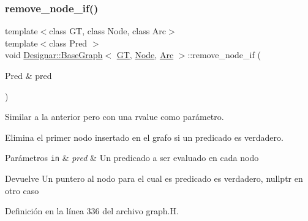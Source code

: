 \subsubsection{\texorpdfstring{remove\+\_\+node\+\_\+if()}{remove\_node\_if()}\hspace{0.1cm}{\footnotesize\ttfamily [1/2]}}
{\footnotesize\ttfamily template$<$class GT, class Node, class Arc$>$ \\
template$<$class Pred $>$ \\
void \hyperlink{class_designar_1_1_base_graph}{Designar\+::\+Base\+Graph}$<$ \hyperlink{demo-buildgraph_8_c_a3001c40d2c31ca87ed96cd7d1334a55e}{GT}, \hyperlink{namespace_designar_a5af326c65aa2bd26b26c410f2030d09e}{Node}, \hyperlink{namespace_designar_a3f55fb5513d62ff47cbc8f72b8e95d6f}{Arc} $>$\+::remove\+\_\+node\+\_\+if (\begin{DoxyParamCaption}\item[{Pred \&}]{pred }\end{DoxyParamCaption})\hspace{0.3cm}{\ttfamily [inline]}}



Similar a la anterior pero con una rvalue como parámetro. 

Elimina el primer nodo insertado en el grafo si un predicado es verdadero.


\begin{DoxyParams}[1]{Parámetros}
\mbox{\tt in}  & {\em pred} & Un predicado a ser evaluado en cada nodo \\
\hline
\end{DoxyParams}
\begin{DoxyReturn}{Devuelve}
Un puntero al nodo para el cual es predicado es verdadero, {\ttfamily nullptr} en otro caso 
\end{DoxyReturn}


Definición en la línea 336 del archivo graph.\+H.

\mbox{\label{class_designar_1_1_base_graph_a6e63659d272255254f6abc29c1e09724}} 
